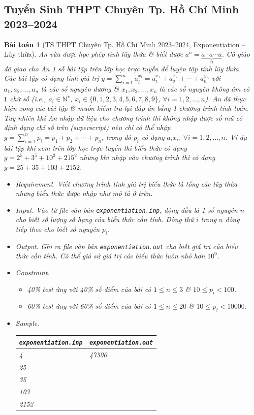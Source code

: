 \documentclass{article}
\newtheorem{baitoan}{Bài toán}
\begin{document}
\subsection{Tuyển Sinh THPT Chuyên Tp. Hồ Chí Minh 2023--2024}

\begin{baitoan}[TS THPT Chuyên Tp. Hồ Chí Minh 2023--2024, Exponentiation -- Lũy thừa]
	An vừa được học phép tính lũy thừa \& biết được $a^n = \underbrace{a\cdot a\cdots a}_n$. Cô giáo đã giao cho An 1 số bài tập trên lớp học trực tuyến để luyện tập tính lũy thừa. Các bài tập có dạng tính giá trị $y = \sum_{i=1}^n a_i^{x_i} = a_1^{x_1} + a_2^{x_2} + \cdots + a_n^{x_n}$ với $a_1,a_2,\ldots,a_n$ là các số nguyên dương \& $x_1,x_2,\ldots,x_n$ là các số nguyên không âm có $1$ chữ số (i.e., $a_i\in\mathbb{N}^\star$, $x_i\in\{0,1,2,3,4,5,6,7,8,9\}$, $\forall i = 1,2,\ldots,n$). An đã thực hiện xong các bài tập \& muốn kiểm tra lại đáp án bằng 1 chương trình tính toán. Tuy nhiên khi An nhập dữ liệu cho chương trình thì không nhập được số mũ có định dạng chỉ số trên (superscript) nên chỉ có thể nhập $y = \sum_{i=1}^n p_i = p_1 + p_2 + \cdots + p_n$, trong đó $p_i$ có dạng $a_ix_i$, $\forall i = 1,2,\ldots,n$. Ví dụ bài tập khi xem trên lớp học trực tuyến thì biểu thức có dạng $y = 2^5 + 3^5 + 10^3 + 215^2$ nhưng khi nhập vào chương trình thì có dạng $y = 25 + 35 +103 + 2152$.
	\begin{itemize}
		\item {\sf Requirement.} Viết chương trình tính giá trị biểu thức là tổng các lũy thừa nhưng biểu thức được nhập như mô tả ở trên.
		\item {\sf Input.} Vào từ file văn bản {\tt exponentiation.inp}, dòng đầu là 1 số nguyên $n$ cho biết số lượng số hạng của biểu thức cần tính. Dòng thứ $i$ trong $n$ dòng tiếp theo cho biết số nguyên $p_i$.
		\item {\sf Output.} Ghi ra file văn bản {\tt exponentiation.out} cho biết giá trị của biểu thức cần tính. Có thể giả sử giá trị các biểu thức luôn nhỏ hơn $10^9$.
		\item {\sf Constraint.}
		\begin{itemize}
			\item {\rm40\%} test ứng với {\rm40\%} số điểm của bài có $1\le n\le3$ \& $10\le p_i < 100$.
			\item {\rm60\%} test ứng với {\rm60\%} số điểm của bài có $1\le n\le20$ \& $10\le p_i < 10000$.
		\end{itemize}
		\item {\sf Sample.}
		\begin{table}[H]
			\centering
			\begin{tabular}{|l|l|}
				\hline
				\texttt{exponentiation.inp} & \texttt{exponentiation.out} \\
				\hline
				4 & 47500 \\
				25 &  \\
				35 &  \\
				103 &  \\
				2152 &  \\
				\hline
			\end{tabular}
		\end{table}
	\end{itemize}
\end{baitoan}
\end{document}
